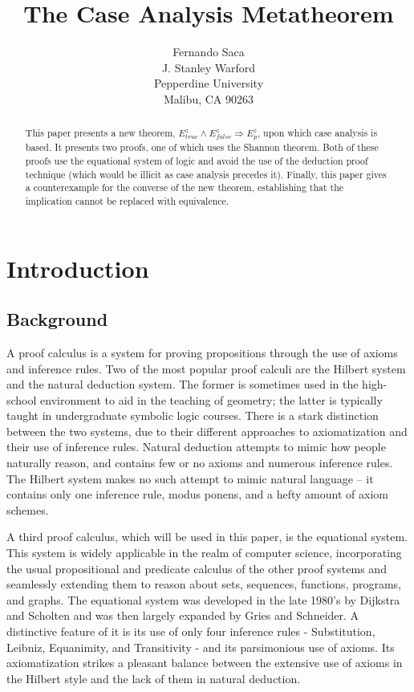 \documentclass[12pt, fleqn, leqno]{article}
\title{The Case Analysis Metatheorem}
\author{
   Fernando Saca\\
   J. Stanley Warford\\
   Pepperdine University\\
   Malibu, CA 90263}
\date{} %
\newcommand{\impl}{\ensuremath{\Rightarrow}}        %
\begin{document}
\maketitle
\begin{abstract}

This paper presents a new theorem, $E^{z}_{true}\land E^{z}_{false} \impl E^{z}_{p}$, upon which case analysis is based.
It presents two proofs, one of which uses the Shannon theorem.
Both of these proofs use the equational system of logic and avoid the use of the deduction proof technique (which would be illicit as case analysis precedes it).
Finally, this paper gives a counterexample for the converse of the new theorem, establishing that the implication cannot be replaced with equivalence.

\end{abstract}

\thispagestyle{plain}

\section{Introduction}

\subsection{Background}

A proof calculus is a system for proving propositions through the use of axioms and inference rules. Two of the most popular proof calculi are the Hilbert system and the natural deduction system. The former is sometimes used in the high-school environment to aid in the teaching of geometry; the latter is typically taught in undergraduate symbolic logic courses. There is a stark distinction between the two systems, due to their different approaches to axiomatization and their use of inference rules. Natural deduction attempts to mimic how people naturally reason, and contains few or no axioms and numerous inference rules. The Hilbert system makes no such attempt to mimic natural language -- it contains only one inference rule, modus ponens, and a hefty amount of axiom schemes.

A third proof calculus, which will be used in this paper, is the equational system. This system is widely applicable in the realm of computer science, incorporating the usual propositional and predicate calculus of the other proof systems and seamlessly extending them to reason about sets, sequences, functions, programs, and graphs. The equational system was developed in the late 1980’s by Dijkstra and Scholten and was then largely expanded by Gries and Schneider. A distinctive feature of it is its use of only four inference rules - Substitution, Leibniz, Equanimity, and Transitivity - and its parsimonious use of axioms. Its axiomatization strikes a pleasant balance between the extensive use of axioms in the Hilbert style and the lack of them in natural deduction.
\end{document}
